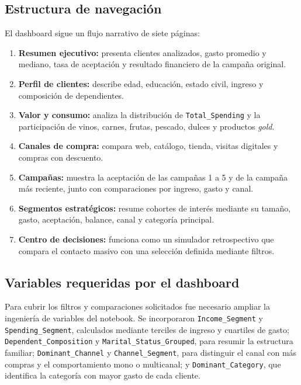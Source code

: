 \documentclass[12pt]{article}
\begin{document}
\subsection*{Estructura de navegación}

El dashboard sigue un flujo narrativo de siete páginas:

\begin{enumerate}[leftmargin=1.8em, itemsep=0.35em]
    \item \textbf{Resumen ejecutivo:} presenta clientes analizados, gasto promedio y mediano, tasa de aceptación y resultado financiero de la campaña original.
    \item \textbf{Perfil de clientes:} describe edad, educación, estado civil, ingreso y composición de dependientes.
    \item \textbf{Valor y consumo:} analiza la distribución de \texttt{Total\_Spending} y la participación de vinos, carnes, frutas, pescado, dulces y productos \textit{gold}.
    \item \textbf{Canales de compra:} compara web, catálogo, tienda, visitas digitales y compras con descuento.
    \item \textbf{Campañas:} muestra la aceptación de las campañas 1 a 5 y de la campaña más reciente, junto con comparaciones por ingreso, gasto y canal.
    \item \textbf{Segmentos estratégicos:} resume cohortes de interés mediante su tamaño, gasto, aceptación, balance, canal y categoría principal.
    \item \textbf{Centro de decisiones:} funciona como un simulador retrospectivo que compara el contacto masivo con una selección definida mediante filtros.
\end{enumerate}

\subsection*{Variables requeridas por el dashboard}

Para cubrir los filtros y comparaciones solicitados fue necesario ampliar la ingeniería de variables del notebook. Se incorporaron \texttt{Income\_Segment} y \texttt{Spending\_Segment}, calculados mediante terciles de ingreso y cuartiles de gasto; \texttt{Dependent\_Composition} y \texttt{Marital\_Status\_Grouped}, para resumir la estructura familiar; \texttt{Dominant\_Channel} y \texttt{Channel\_Segment}, para distinguir el canal con más compras y el comportamiento mono o multicanal; y \texttt{Dominant\_Category}, que identifica la categoría con mayor gasto de cada cliente.
\end{document}
